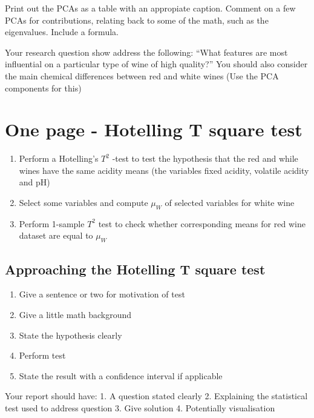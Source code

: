 \documentclass[
]{article}
\providecommand{\tightlist}{%
  \setlength{\itemsep}{0pt}\setlength{\parskip}{0pt}}
\begin{document}
Print out the PCAs as a table with an appropiate caption. Comment on a
few PCAs for contributions, relating back to some of the math, such as
the eigenvalues. Include a formula.

Your research question show address the following: ``What features are
most influential on a particular type of wine of high quality?'' You
should also consider the main chemical differences between red and white
wines (Use the PCA components for this)

\section{One page - Hotelling T square
test}\label{one-page---hotelling-t-square-test}

\begin{enumerate}
\def\labelenumi{\arabic{enumi}.}
\tightlist
\item
  Perform a Hotelling's \(T^2\) -test to test the hypothesis that the
  red and while wines have the same acidity means (the variables fixed
  acidity, volatile acidity and pH)
\item
  Select some variables and compute \(\mu_W\) of selected variables for
  white wine
\item
  Perform 1-sample \(T^2\) test to check whether corresponding means for
  red wine dataset are equal to \(\mu_W\)
\end{enumerate}

\subsection{Approaching the Hotelling T square
test}\label{approaching-the-hotelling-t-square-test}

\begin{enumerate}
\def\labelenumi{\arabic{enumi}.}
\tightlist
\item
  Give a sentence or two for motivation of test
\item
  Give a little math background
\item
  State the hypothesis clearly
\item
  Perform test
\item
  State the result with a confidence interval if applicable
\end{enumerate}

Your report should have: 1. A question stated clearly 2. Explaining the
statistical test used to address question 3. Give solution 4.
Potentially visualisation
\end{document}
